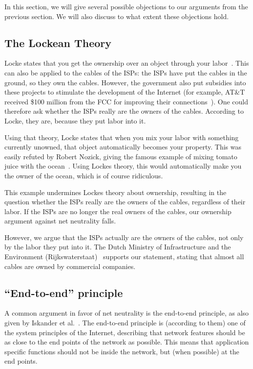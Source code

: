 
In this section, we will give several possible objections to our arguments from the previous section.
We will also discuss to what extent these objections hold.

\subsection{The Lockean Theory}
Locke states that you get the ownership over an object through your labor~\cite{tuckness2012locke}.
This can also be applied to the cables of the \acp{ISP}: the \acp{ISP} have put the cables in the ground, so they own the cables.
However, the government also put subsidies into these projects to stimulate the development of the Internet (for example, AT\&T received \$100 million from the FCC for improving their connections~\cite{bode2013att}).
One could therefore ask whether the \acp{ISP} really are the owners of the cables.
According to Locke, they are, because they put labor into it.

Using that theory, Locke states that when you mix your labor with something currently unowned, that object automatically becomes your property.
This was easily refuted by Robert Nozick, giving the famous example of mixing tomato juice with the ocean~\cite{tuckness2012locke}.
Using Lockes theory, this would automatically make you the owner of the ocean, which is of course ridiculous.

This example undermines Lockes theory about ownership, resulting in the question whether the \acp{ISP} really are the owners of the cables, regardless of their labor.
If the \acp{ISP} are no longer the real owners of the cables, our ownership argument against net neutrality falls.

However, we argue that the \acp{ISP} actually are the owners of the cables, not only by the labor they put into it.
The Dutch Ministry of Infrastructure and the Environment (Rijkswaterstaat)~\cite{rws2014kabels} supports our statement, stating that almost all cables are owned by commercial companies.

\subsection{``End-to-end'' principle}
A common argument in favor of net neutrality is the end-to-end principle, as also given by Iskander et al.~\cite{iskander2010end}.
The end-to-end principle is (according to them) one of the system principles of the Internet, describing that network features should be as close to the end points of the network as possible.
This means that application specific functions should not be inside the network, but (when possible) at the end points.

